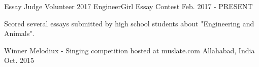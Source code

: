 


\begin{cventries}

\cventry
{Essay Judge Volunteer} %
{2017 EngineerGirl Essay Contest } %
{}
{Feb. 2017 - PRESENT} %
{ %
\begin{cvitems}
\item {Scored several essays submitted by high school students about "Engineering and Animals".}
\end{cvitems}
}
\cventry
{Winner} %
{Melodiux - Singing competition hosted at muslate.com } %
{Allahabad, India} %
{Oct. 2015 } %
{ %
}

\end{cventries}